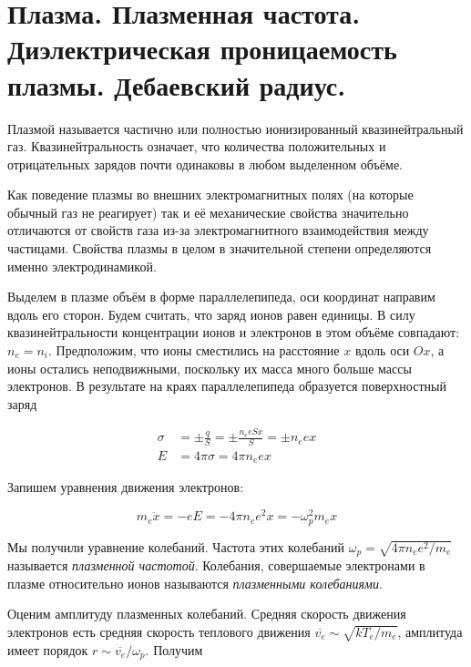 \section{Плазма. Плазменная частота. Диэлектрическая проницаемость плазмы. Дебаевский радиус.}

\begin{definition}
    Плазмой называется частично или полностью ионизированный квазинейтральный газ. Квазинейтральность означает, что количества положительных и отрицательных зарядов почти одинаковы в любом выделенном объёме.
\end{definition}

Как поведение плазмы во внешних электромагнитных полях (на которые обычный газ не реагирует) так и её механические свойства значительно отличаются от свойств газа из-за электромагнитного взаимодействия между частицами. Свойства плазмы в целом в значительной степени определяются именно электродинамикой.

Выделем в плазме объём в форме параллелепипеда, оси координат направим вдоль его сторон. Будем считать, что заряд ионов равен единицы. В силу квазинейтральности концентрации ионов и электронов в этом объёме совпадают: $n_e = n_i$. Предположим, что ионы сместились на расстояние $x$ вдоль оси $O x$, а ионы остались неподвижными, поскольку их масса много больше массы электронов. В результате на краях параллелепипеда образуется поверхностный заряд

\begin{align}
    \sigma &= \pm \frac{q}{S} = \pm \frac{n_e e S x}{S} = \pm n_e e x \\
    E  &= 4 \pi \sigma = 4 \pi n_e e x
\end{align}

\noindent
Запишем уравнения движения электронов:

\begin{equation}
    m_e \ddot x = -e E = - 4 \pi n_e e^2 x = - \omega_p^2 m_e x
\end{equation}

\noindent
Мы получили уравнение колебаний. Частота этих колебаний $\omega_p = \sqrt{4 \pi n_e e^2 / m_e}$ называется \textit{плазменной частотой}. Колебания, совершаемые электронами в плазме относительно ионов называются \textit{плазменными колебаниями}.

Оценим амплитуду плазменных колебаний. Средняя скорость движения электронов есть средняя скорость теплового движения $\overline{v_e} \sim \sqrt{k T_e / m_e}$, амплитуда имеет порядок $r \sim \overline{v_e} / \omega_p$. Получим

